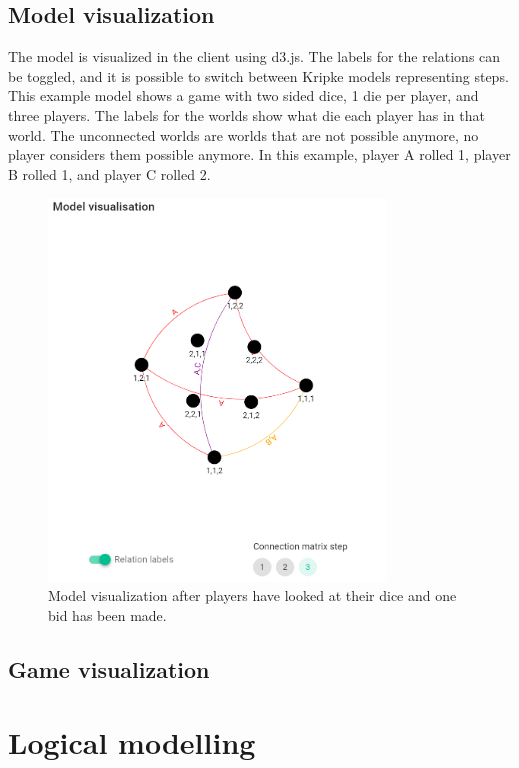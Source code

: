 \documentclass{article}
\begin{document}
\subsection*{Model visualization} %
The model is visualized in the client using d3.js. The labels for the relations can be toggled, and it is possible to switch between Kripke models representing steps. This example model shows a game with two sided dice, 1 die per player, and three players. The labels for the worlds show what die each player has in that world. The unconnected worlds are worlds that are not possible anymore, no player considers them possible anymore. In this example, player A rolled 1, player B rolled 1, and player C rolled 2.
\begin{figure}[h]
    \includegraphics[width=0.8\textwidth]{img/screenshot.png}
    \centering
    \caption{Model visualization after players have looked at their dice and one bid has been made.}
    \label{fig:liarsdice}
\end{figure}
\subsection*{Game visualization}%

\section*{Logical modelling}
\end{document}
